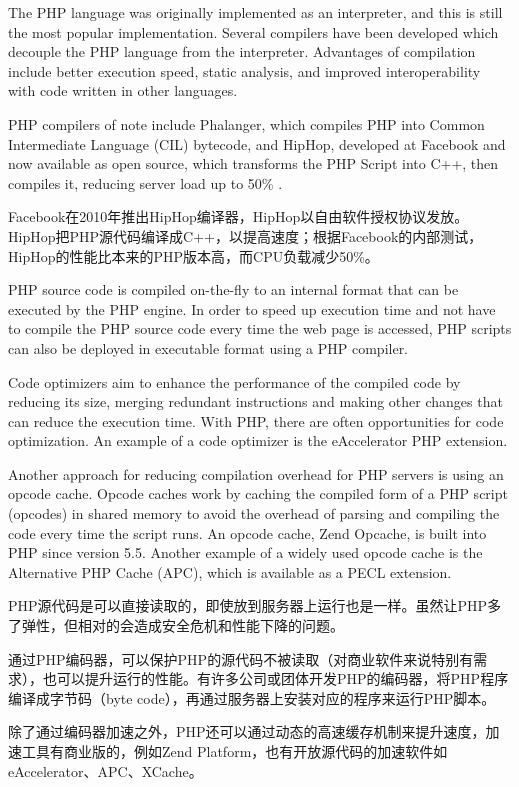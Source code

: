 The PHP language was originally implemented as an interpreter, and this is still the most popular implementation. Several compilers have been developed which decouple the PHP language from the interpreter. Advantages of compilation include better execution speed, static analysis, and improved interoperability with code written in other languages.

PHP compilers of note include Phalanger, which compiles PHP into Common Intermediate Language (CIL) bytecode, and HipHop, developed at Facebook and now available as open source, which transforms the PHP Script into C++, then compiles it, reducing server load up to 50\% .

Facebook在2010年推出HipHop编译器，HipHop以自由软件授权协议发放。HipHop把PHP源代码编译成C++，以提高速度；根据Facebook的内部测试，HipHop的性能比本来的PHP版本高，而CPU负载减少50\%。

PHP source code is compiled on-the-fly to an internal format that can be executed by the PHP engine. In order to speed up execution time and not have to compile the PHP source code every time the web page is accessed, PHP scripts can also be deployed in executable format using a PHP compiler.


Code optimizers aim to enhance the performance of the compiled code by reducing its size, merging redundant instructions and making other changes that can reduce the execution time. With PHP, there are often opportunities for code optimization. An example of a code optimizer is the eAccelerator PHP extension.

Another approach for reducing compilation overhead for PHP servers is using an opcode cache. Opcode caches work by caching the compiled form of a PHP script (opcodes) in shared memory to avoid the overhead of parsing and compiling the code every time the script runs. An opcode cache, Zend Opcache, is built into PHP since version 5.5. Another example of a widely used opcode cache is the Alternative PHP Cache (APC), which is available as a PECL extension.

PHP源代码是可以直接读取的，即使放到服务器上运行也是一样。虽然让PHP多了弹性，但相对的会造成安全危机和性能下降的问题。

通过PHP编码器，可以保护PHP的源代码不被读取（对商业软件来说特别有需求），也可以提升运行的性能。有许多公司或团体开发PHP的编码器，将PHP程序编译成字节码（byte code），再通过服务器上安装对应的程序来运行PHP脚本。

除了通过编码器加速之外，PHP还可以通过动态的高速缓存机制来提升速度，加速工具有商业版的，例如Zend Platform，也有开放源代码的加速软件如eAccelerator、APC、XCache。

